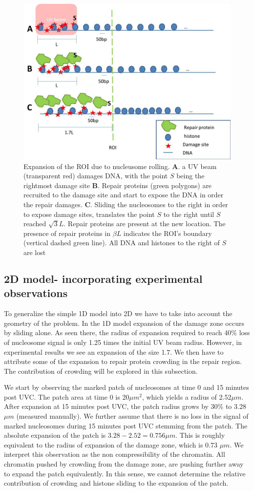\documentclass[12pt]{report}
\begin{document}
   \begin{figure}
   	\centering
   	\includegraphics[width=0.7\linewidth]{histoneSlidingMulti}
   	\caption{Expansion of the ROI due to nucleusome rolling. \textbf{A}. a UV beam (transparent red) damages DNA, with the point $S$ being the rightmost damage site \textbf{B}. Repair proteins (green polygons) are recruited to the damage site and start to expose the DNA in order the repair damages. \textbf{C}. Sliding the nucleosomes to the right in order to expose damage sites, translates the point $S$ to the right until $S$ reached $\sqrt{3}L$. Repair proteins are present at the new location. The presence of repair proteins in $\beta L$ indicates the ROI's boundary (vertical dashed green line). All DNA and histones to the right of $S$ are lost}
   	\label{fig:histoneSlidingMulti}
   \end{figure}
   
\subsection{2D model- incorporating experimental observations}\label{subsection:2dModel}
To generalize the simple 1D model into 2D we have to take into account the geometry of the problem. In the 1D model expansion of the damage zone occurs by sliding alone. As seen there, the radius of expansion required to reach 40\% loss of nucleosome signal is only 1.25 times the initial UV beam radius. However, in experimental results we see an expansion of the size 1.7. We then have to attribute some of the expansion to repair protein crowding in the repair region. The contribution of crowding will be explored in this subsection. 

We start by observing the marked patch of nucleosomes at time 0 and 15 minutes post UVC. The patch area at time 0 is 20$\mu m^2$, which yields a radius of 2.52$\mu m$. After expansion at 15 minutes post UVC, the patch radius grows by 30\% to 3.28$\mu m$ (measured manually). We further assume that there is no loss in the signal of marked nucleosomes during 15 minutes post UVC stemming from the patch. The absolute expansion of the patch is $3.28-2.52=0.756\mu m$. This is roughly equivalent to the radius of expansion of the damage zone, which is 0.73 $\mu m$. We interpret this observation as the non compressibility of the chromatin. All chromatin pushed by crowding from the damage zone, are pushing further away to expand the patch equivalently. In this sense, we cannot determine the relative contribution of crowding and histone sliding to the expansion of the patch. 
\end{document}
